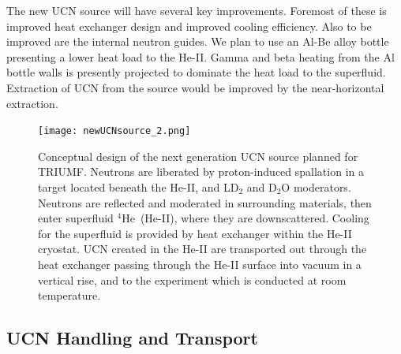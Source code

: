 The new UCN source will have several key improvements. Foremost of these
is improved heat exchanger design and improved cooling
efficiency. Also to be improved are the internal neutron guides. We
plan to use an Al-Be alloy bottle presenting a lower heat load to the
He-II. Gamma and beta heating from the Al bottle walls is presently
projected to dominate the heat load to the superfluid. Extraction of
UCN from the source would be improved by the near-horizontal
extraction.



\begin{figure}[h!]
  \centering
  \texttt{[image: newUCNsource\_2.png]}
  \caption[Conceptual design of TUCAN's new UCN source]{Conceptual
    design of the next generation UCN source planned for
    TRIUMF. Neutrons are liberated by proton-induced spallation in a
    target located beneath the He-II, and LD$_2$ and D$_2$O
    moderators. Neutrons are reflected and moderated in surrounding
    materials, then enter superfluid $^4$He~(He-II), where they are
    downscattered. Cooling for the superfluid is provided by heat
    exchanger within the He-II cryostat. UCN created in the He-II are
    transported out through the heat exchanger passing through the
    He-II surface into vacuum in a vertical rise, and to the
    experiment which is conducted at room temperature.}
  \label{fig:newUCNsource_2}
\end{figure}

\subsection{UCN Handling and Transport}

